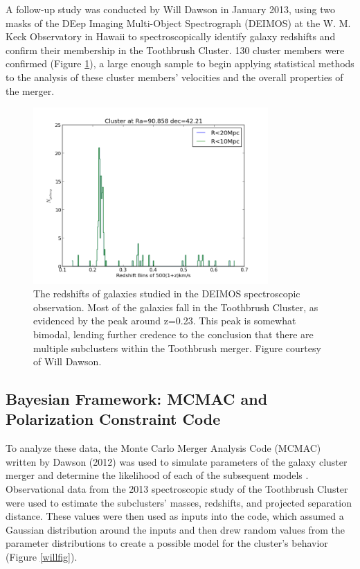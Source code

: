 \documentclass[12 pt]{article}
\renewcommand{\baselinestretch}{2}
\begin{document}
A follow-up study was conducted by Will Dawson in January 2013, using two masks of the DEep Imaging Multi-Object Spectrograph (DEIMOS) at the W. M. Keck Observatory in Hawaii to spectroscopically identify galaxy redshifts and confirm their membership in the Toothbrush Cluster. 130 cluster members were confirmed (Figure \ref{velocities}), a large enough sample to begin applying statistical methods to the analysis of these cluster members' velocities and the overall properties of the merger. 

\renewcommand{\baselinestretch}{1}
\begin{figure}[h]
\caption{The redshifts of galaxies studied in the DEIMOS spectroscopic observation. Most of the galaxies fall in the Toothbrush Cluster, as evidenced by the peak around z=0.23. This peak is somewhat bimodal, lending further credence to the conclusion that there are multiple subclusters within the Toothbrush merger. Figure courtesy of Will Dawson.}
\label{velocities}
\centering
\includegraphics[width=0.8\textwidth]{hist_allspec}
\end{figure}
\renewcommand{\baselinestretch}{2}

\subsection{Bayesian Framework: MCMAC and Polarization Constraint Code}

To analyze these data, the Monte Carlo Merger Analysis Code (MCMAC) written by Dawson (2012) was used to simulate parameters of the galaxy cluster merger and determine the likelihood of each of the subsequent models \cite{Dawson13}. Observational data from the 2013 spectroscopic study of the Toothbrush Cluster were used to estimate the subclusters' masses, redshifts, and projected separation distance. These values were then used as inputs into the code, which assumed a Gaussian distribution around the inputs and then drew random values from the parameter distributions to create a possible model for the cluster's behavior (Figure \ref{willfig}). 
\end{document}

